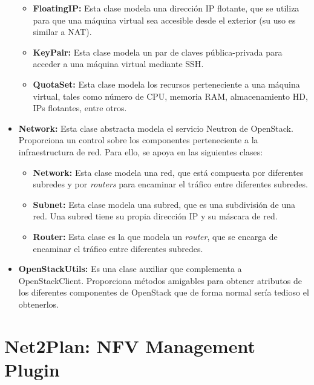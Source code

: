 \begin{itemize}
\begin{itemize}
		\item \textbf{FloatingIP:} Esta clase modela una dirección \ac{IP} flotante, que se utiliza para que una máquina virtual sea accesible desde el exterior (su uso es similar a \ac{NAT}).
		
		\item \textbf{KeyPair:} Esta clase modela un par de claves pública-privada para acceder a una máquina virtual mediante \ac{SSH}.
		
		\item \textbf{QuotaSet:} Esta clase modela los recursos perteneciente a una máquina virtual, tales como número de CPU, memoria RAM, almacenamiento HD, \ac{IP}s flotantes, entre otros.
		
		
	\end{itemize}
		
	\item \textbf{Network:} Esta clase abstracta modela el servicio Neutron de OpenStack. Proporciona un control sobre los componentes perteneciente a la infraestructura de red. Para ello, se apoya en las siguientes clases:
	
		\begin{itemize}
		
		\item \textbf{Network:} Esta clase modela una red, que está compuesta por diferentes subredes y por \textit{routers} para encaminar el tráfico entre diferentes subredes.
		
		\item \textbf{Subnet:} Esta clase modela una subred, que es una subdivisión de una red. Una subred tiene su propia dirección \ac{IP} y su máscara de red.
		
		\item \textbf{Router:} Esta clase es la que modela un \textit{router}, que se encarga de encaminar el tráfico entre diferentes subredes.
		
		\end{itemize}
	
	\item \textbf{OpenStackUtils:} Es una clase auxiliar que complementa a OpenStackClient. Proporciona métodos amigables para obtener atributos de los diferentes componentes de OpenStack que de forma normal sería tedioso el obtenerlos.
	
	
\end{itemize}

\section{Net2Plan: NFV Management Plugin}
\label{sec:nfvplugin}

